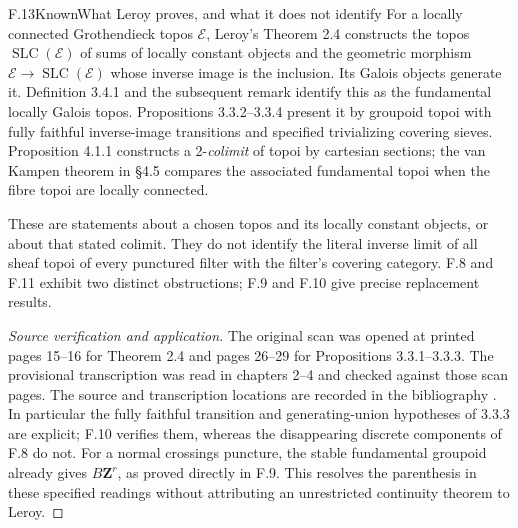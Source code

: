 \begin{statement}{F.13}{Known}{What Leroy proves, and what it does not identify}
For a locally connected Grothendieck topos $\mathcal E$, Leroy's
Theorem 2.4 constructs the topos
$\operatorname{SLC}(\mathcal E)$ of sums of locally constant
objects and the geometric morphism
$\mathcal E\to\operatorname{SLC}(\mathcal E)$ whose inverse
image is the inclusion. Its Galois objects generate it. Definition
3.4.1 and the subsequent remark identify this as the fundamental
locally Galois topos. Propositions 3.3.2--3.3.4 present it by
groupoid topoi with fully faithful inverse-image transitions and
specified trivializing covering sieves. Proposition 4.1.1 constructs
a 2-\emph{colimit} of topoi by cartesian sections; the van Kampen theorem in \S4.5
compares the associated fundamental topoi when the fibre topoi are
locally connected.

These are statements about a chosen topos and its locally constant
objects, or about that stated colimit. They do not identify the
literal inverse limit of all sheaf topoi of every punctured filter
with the filter's covering category. F.8 and F.11 exhibit two distinct
obstructions; F.9 and F.10 give precise replacement results.
\end{statement}
\begin{proof}[Source verification and application]
The original scan was opened at printed pages 15--16 for Theorem
2.4 and pages 26--29 for Propositions 3.3.1--3.3.3. The provisional
transcription was read in chapters 2--4 and checked against those
scan pages. The source and transcription locations are recorded in
the bibliography \cite{fghLeroy}. In particular the fully faithful
transition and generating-union hypotheses of 3.3.3 are explicit;
F.10 verifies them, whereas the disappearing discrete components of
F.8 do not. For a normal crossings puncture, the stable fundamental
groupoid already gives $B\mathbf Z^r$, as proved directly in F.9.
This resolves the parenthesis in these specified readings without
attributing an unrestricted continuity theorem to Leroy.
\end{proof}

